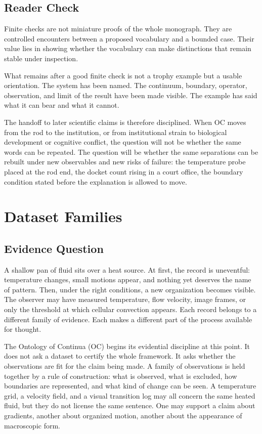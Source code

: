 \documentclass[11pt,a4paper,openany]{book}
\begin{document}
\subsection{Reader Check}
Finite checks are not miniature proofs of the whole monograph. They are controlled encounters between a proposed vocabulary and a bounded case. Their value lies in showing whether the vocabulary can make distinctions that remain stable under inspection. \cite{kadanoff_scaling,wilson_renormalization}\par
What remains after a good finite check is not a trophy example but a usable orientation. The system has been named. The continuum, boundary, operator, observation, and limit of the result have been made visible. The example has said what it can bear and what it cannot.\par
The handoff to later scientific claims is therefore disciplined. When OC moves from the rod to the institution, or from institutional strain to biological development or cognitive conflict, the question will not be whether the same words can be repeated. The question will be whether the same separations can be rebuilt under new observables and new risks of failure: the temperature probe placed at the rod end, the docket count rising in a court office, the boundary condition stated before the explanation is allowed to move.\par
\section{Dataset Families}
\subsection{Evidence Question}
A shallow pan of fluid sits over a heat source. At first, the record is uneventful: temperature changes, small motions appear, and nothing yet deserves the name of pattern. Then, under the right conditions, a new organization becomes visible. The observer may have measured temperature, flow velocity, image frames, or only the threshold at which cellular convection appears. Each record belongs to a different family of evidence. Each makes a different part of the process available for thought. \cite{wilson_renormalization,landau_stat_physics}\par
The Ontology of Continua (OC) begins its evidential discipline at this point. It does not ask a dataset to certify the whole framework. It asks whether the observations are fit for the claim being made. A family of observations is held together by a rule of construction: what is observed, what is excluded, how boundaries are represented, and what kind of change can be seen. A temperature grid, a velocity field, and a visual transition log may all concern the same heated fluid, but they do not license the same sentence. One may support a claim about gradients, another about organized motion, another about the appearance of macroscopic form.\par
\end{document}
